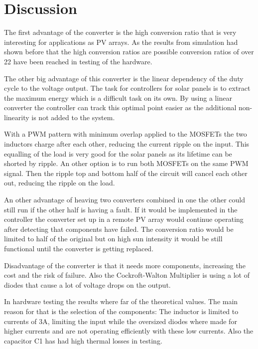 \chapter{Discussion}\label{ch:Discussion}


The first advantage of the converter is the high conversion ratio that is very interesting for applications as PV arrays. As the results from simulation had shown before that the high conversion ratios are possible conversion ratios of over 22 have been reached in testing of the hardware.


The other big advantage of this converter is the linear dependency of the duty cycle to the voltage output. The task for controllers for solar panels is to extract the maximum energy which is a difficult task on its own. 
By using a linear converter the controller can track this optimal point easier as the additional non-linearity is not added to the system.


With a PWM pattern with minimum overlap applied to the MOSFETs the two inductors charge after each other, reducing the current ripple on the input. This equalling of the load is very good for the solar panels as its lifetime can be shorted by ripple. %
An other option is to run both MOSFETs on the same PWM signal.
Then the ripple top and bottom half of the circuit will cancel each other out, reducing the ripple on the load. 

An other advantage of heaving two converters combined in one the other could still run if the other half is having a fault.
If it would be implemented in the controller the converter set up in a remote PV array would continue operating after detecting that components have failed. 
The conversion ratio would be limited to half of the original but on high sun intensity it would be still functional until the converter is getting replaced.


Disadvantage of the converter is that it needs more components, increasing the cost and the risk of failure.
Also the Cockroft-Walton Multiplier is using a lot of diodes that cause a lot of voltage drops on the output.

In hardware testing the results where far of the theoretical values. The main reason for that is the selection of the components: 
The inductor is limited to currents of 3A, limiting the input while the oversized diodes where made for higher currents and are not operating efficiently with these low currents.
Also the capacitor C1 has had high thermal losses in testing.

